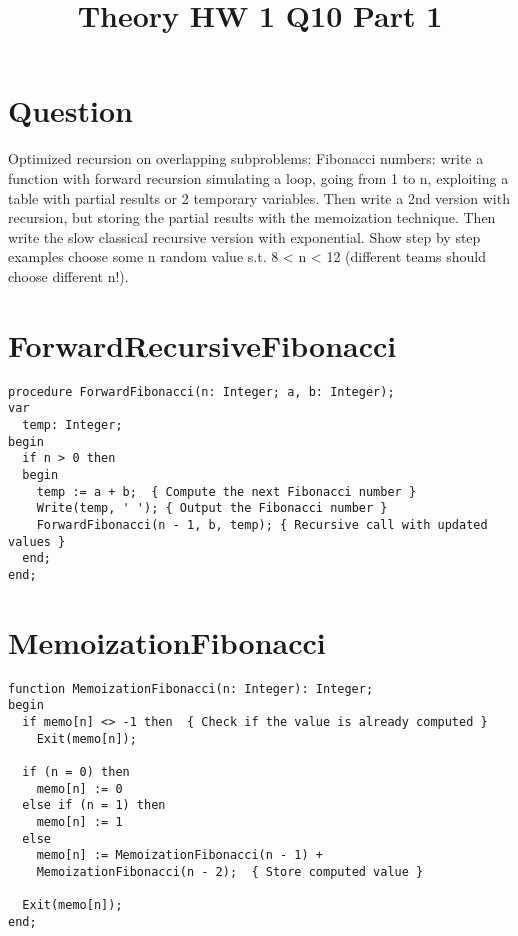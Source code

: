 \documentclass[conference]{IEEEtran}
\begin{document}
\title{Theory HW 1 Q10 Part 1}

\author{
}

\maketitle

\section{Question}
%
Optimized recursion on overlapping subproblems:
Fibonacci numbers: write a function with forward recursion simulating a loop, going from 1 to
n, exploiting a table with partial results or 2 temporary variables. Then write a 2nd version with
recursion, but storing the partial results with the memoization technique. Then write the slow
classical recursive version with exponential. Show step by step examples choose some n
random value s.t. 8 < n < 12 (different teams should choose different n!).




\section{ForwardRecursiveFibonacci}

\begin{verbatim}
procedure ForwardFibonacci(n: Integer; a, b: Integer);
var
  temp: Integer;
begin
  if n > 0 then
  begin
    temp := a + b;  { Compute the next Fibonacci number }
    Write(temp, ' '); { Output the Fibonacci number }
    ForwardFibonacci(n - 1, b, temp); { Recursive call with updated values }
  end;
end;
\end{verbatim}


\section{MemoizationFibonacci}
\begin{verbatim}
function MemoizationFibonacci(n: Integer): Integer;
begin
  if memo[n] <> -1 then  { Check if the value is already computed }
    Exit(memo[n]);

  if (n = 0) then
    memo[n] := 0
  else if (n = 1) then
    memo[n] := 1
  else
    memo[n] := MemoizationFibonacci(n - 1) +
    MemoizationFibonacci(n - 2);  { Store computed value }

  Exit(memo[n]);
end;






\end{verbatim}
\end{document}
